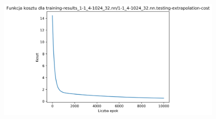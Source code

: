 \documentclass{classrep}
\begin{document}
{{{\begin{figure}[!htbp]
                \end{figure}
                \begin{figure}[!htbp]
                    \centering
                    \includegraphics[width=120mm]{wykresy/1-1_4-1024_32_nn_testing-extrapolation-cost.png}
                \end{figure}
                \FloatBarrier
            }
        }
}
\end{document}

